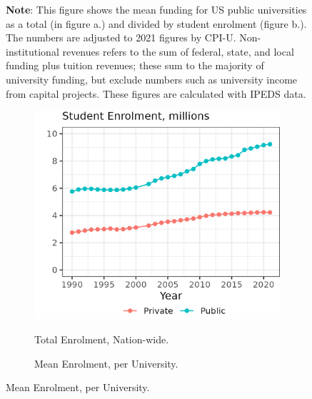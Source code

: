 \begin{figure}[H]
\begin{subfigure}[b]{0.495\textwidth}
        \label{fig:mean-funding-fte}
    \end{subfigure}
    \label{fig:funding}
    \justify
    \footnotesize
    \textbf{Note}:
    This figure shows the mean funding for US public universities as a total (in figure a.) and divided by student enrolment (figure b.).
    The numbers are adjusted to 2021 figures by CPI-U.
    Non-institutional revenues refers to the sum of federal, state, and local funding plus tuition revenues; these sum to the majority of university funding, but exclude numbers such as university income from capital projects.
    These figures are calculated with IPEDS data.
\end{figure}

\begin{figure}[H]
    \centering
    \singlespacing
    \caption{Total Student enrolment, by University Sector and Year.}
    \begin{subfigure}[b]{0.495\textwidth}
        \centering
        \caption{Total Enrolment, Nation-wide.}
        \includegraphics[width=\textwidth]{figures/enrollment-total.png}
        \label{fig:enrollment-total}
    \end{subfigure}
    \begin{subfigure}[b]{0.495\textwidth}
        \centering
        \caption{Mean Enrolment, per University.}

\end{subfigure}
\end{figure}
